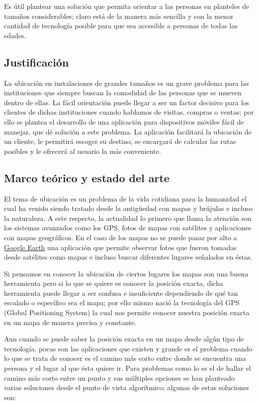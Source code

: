 \documentclass[letterpaper,11pt]{article}
\begin{document}
	Es útil plantear una solución que permita orientar a las 
	personas en planteles de tamaños considerables; 
	claro está de la manera más sencilla y con la menor cantidad de 
	tecnología posible para que sea accesible a  personas de 
	todas las edades.
		
	\subsection{Justificación}
	
	La ubicación en instalaciones de grandes tamaños es un grave problema 
	para las instituciones que siempre buscan la comodidad de 
	las personas que se mueven dentro de ellas. La fácil 
	orientación puede llegar a ser un factor decisivo para los clientes 
	de dichas instituciones cuando hablamos de visitas, compras o 
	ventas; por ello se plantea el desarrollo de una aplicación para 
	dispositivos móviles fácil de manejar, que dé solución a este 
	problema. La aplicación facilitará la ubicación de un cliente, le permitirá 
	escoger su destino, se encargará de calcular las 
	rutas posibles y le ofrecerá al usuario la más conveniente. 
	
	\subsection{Marco teórico y estado del arte}
	
	El tema de ubicación es un problema de la vida cotidiana para 
	la humanidad el cual ha venido siendo tratado desde la antigüedad 
	con mapas y brújulas e incluso la naturaleza. A este respecto,
	la actualidad lo primero que llama la atención son los sistemas 
	avanzados como los GPS, fotos de mapas con satélites y aplicaciones 
	con	mapas geográficos. En el caso de los mapas no se puede pasar por 
	alto a \href{http://earth.google.es}{Google Earth} una aplicación 
	que	permite observar fotos que fueron tomadas desde satélites como 
	mapas e incluso buscar diferentes lugares señalados en éstas.
	
	Si pensamos en conocer la ubicación de ciertos lugares los mapas son
	una buena herramienta pero si lo que se quiere es conocer la 
	posición exacta, dicha herramienta puede llegar a ser confusa e 
	insuficiente dependiendo de qué tan escalado o específico sea el 
	mapa; por ello mismo nació la tecnología del GPS (Global Positioning 
	System) la cual nos permite conocer nuestra posición exacta en un 
	mapa de	manera precisa y constante.
	
	Aun cuando se puede saber la posición exacta en un mapa desde algún 
	tipo de tecnología, pocas son las aplicaciones que existen y grande 
	es el problema cuando lo que se trata de conocer es el camino más 
	corto entre donde se encuentra una persona y el lugar al que ésta
	quiere ir. Para problemas como lo es el de hallar el camino más 
	corto entre un punto y sus múltiples opciones se han planteado 
	varias soluciones desde el punto de vista algorítmico; algunas de 
	estas soluciones son:
	
\end{document}
